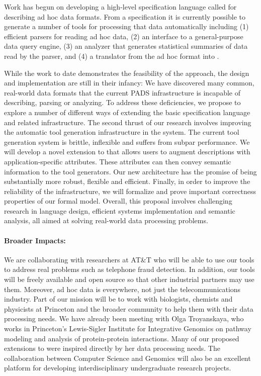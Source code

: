 Work has begun on developing a high-level specification 
language called \pads{} for describing ad hoc data formats.  From a
\pads{} specification it is currently possible to generate a number of
tools for processing that data automatically including (1)
efficient parsers for reading ad hoc data, (2) an interface to a 
general-purpose data query engine, (3) an analyzer that generates 
statistical summaries of data read by the parser, and (4)
a translator from the ad hoc format into \xml.  

While the work to date demonstrates the feasibility of the \pads{}
approach, the \pads{} design and implementation are still in their infancy:
We have discovered many common, real-world data formats that the current PADS 
infrastructure is incapable of describing, parsing or analyzing. 
To address these deficiencies, we propose to explore a number of different ways
of extending the basic \pads{} specification language and related
infrastructure.  The second thrust of our research involves
improving the automatic tool generation infrastructure in the \pads{} system.
The current tool generation system is brittle, inflexible and suffers from
subpar performance.  We will develop a novel extension to \pads{} 
that allows users to augment \pads{} descriptions with application-specific
attributes.  These attributes can then convey semantic information to
the tool generators.  Our new architecture has the promise of being
substantially more robust, flexible and efficient.
Finally, in order to improve the reliability of the infrastructure,
we will formalize \pads{} and prove important correctness properties
of our formal model.  Overall, this proposal involves challenging research in
language design, efficient systems implementation and
semantic analysis, all aimed at solving real-world data processing 
problems.

\paragraph*{Broader Impacts:}  We are collaborating with researchers at
AT\&T who will be able to use our tools to address real problems such as
telephone fraud detection.  In addition, our tools will be 
freely available and open source so that other industrial partners
may use them.  Moreover, ad hoc data is everywhere, not just the
telecommunications industry.  Part of our mission will be to work with 
biologists, chemists and physicists at Princeton and the broader community
to help them with their data 
processing needs.  We have already been meeting with Olga Troyanskaya,
who works in Princeton's Lewis-Sigler Institute for Integrative Genomics 
on pathway modeling and analysis of protein-protein interactions.  Many of our proposed
extensions to \pads{} were inspired directly by her data processing needs.
The collaboration between Computer Science and Genomics will also be an excellent platform
for developing interdisciplinary undergraduate research projects.
